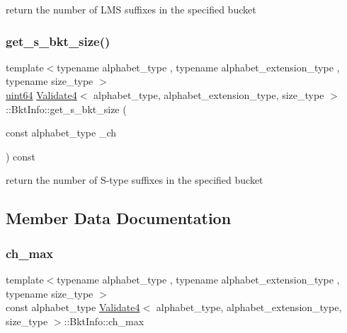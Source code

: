 return the number of L\+MS suffixes in the specified bucket 

\mbox{\label{struct_validate4_1_1_bkt_info_a0c9a5615bab7f7c22d0d3f2de4b2621c}} 
\subsubsection{\texorpdfstring{get\+\_\+s\+\_\+bkt\+\_\+size()}{get\_s\_bkt\_size()}}
{\footnotesize\ttfamily template$<$typename alphabet\+\_\+type , typename alphabet\+\_\+extension\+\_\+type , typename size\+\_\+type $>$ \\
\hyperlink{types_8h_a60e8696a4678cd348e991a1f172e53f7}{uint64} \hyperlink{class_validate4}{Validate4}$<$ alphabet\+\_\+type, alphabet\+\_\+extension\+\_\+type, size\+\_\+type $>$\+::Bkt\+Info\+::get\+\_\+s\+\_\+bkt\+\_\+size (\begin{DoxyParamCaption}\item[{const alphabet\+\_\+type}]{\+\_\+ch }\end{DoxyParamCaption}) const\hspace{0.3cm}{\ttfamily [inline]}}



return the number of S-\/type suffixes in the specified bucket 



\subsection{Member Data Documentation}
\mbox{\label{struct_validate4_1_1_bkt_info_a1485e4eceab1832f682e1751d310d2b9}} 
\subsubsection{\texorpdfstring{ch\+\_\+max}{ch\_max}}
{\footnotesize\ttfamily template$<$typename alphabet\+\_\+type , typename alphabet\+\_\+extension\+\_\+type , typename size\+\_\+type $>$ \\
const alphabet\+\_\+type \hyperlink{class_validate4}{Validate4}$<$ alphabet\+\_\+type, alphabet\+\_\+extension\+\_\+type, size\+\_\+type $>$\+::Bkt\+Info\+::ch\+\_\+max}




